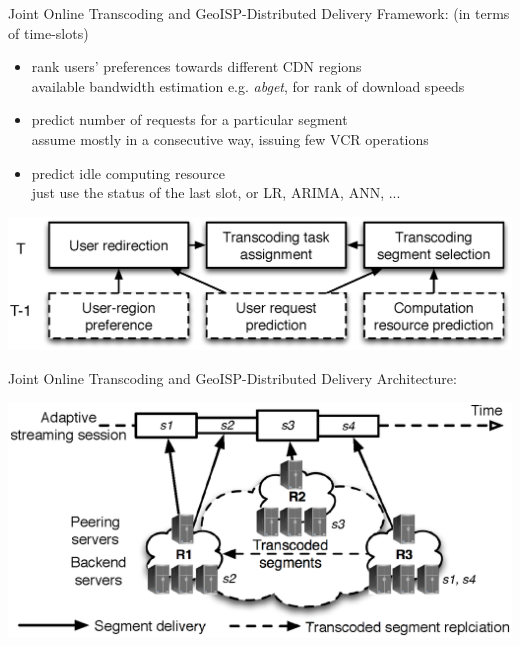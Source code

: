 \documentclass{beamer}
\begin{document}
\begin{frame}{Joint Online Transcoding and GeoISP-Distributed Delivery}
	Framework: (in terms of time-slots)
	\begin{itemize}
		\item<1> rank users' preferences towards different CDN regions\\
		available bandwidth estimation e.g. \emph{abget}, for rank of download speeds
		\item<1> predict number of requests for a particular segment\\
		assume mostly in a consecutive way, issuing few VCR operations
		\item<1> predict idle computing resource\\
		just use the status of the last slot, or LR, ARIMA, ANN, ...
	\end{itemize}
	\begin{center}
	\includegraphics[width=0.7\linewidth]{fig/framework.eps}
	\end{center}
\end{frame}

\begin{frame}{Joint Online Transcoding and GeoISP-Distributed Delivery}
	Architecture:
	\begin{center}
		\includegraphics[width=\linewidth]{fig/geo-on-demand.eps}
	\end{center}
\end{frame}
\end{document}
